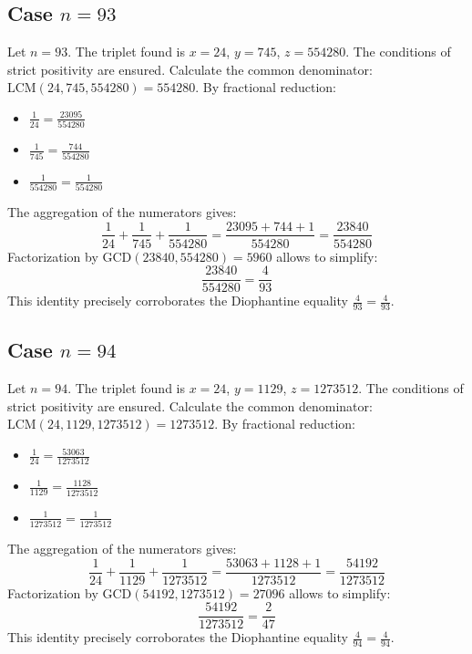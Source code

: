 \documentclass[11pt,a4paper]{article}
\begin{document}
\subsection{Case $n = 93$}
Let $n = 93$. The triplet found is $x = 24$, $y = 745$, $z = 554280$.
The conditions of strict positivity are ensured.
Calculate the common denominator: $\text{LCM}(24, 745, 554280) = 554280$.
By fractional reduction:
\begin{itemize}
    \item $\frac{1}{24} = \frac{23095}{554280}$
    \item $\frac{1}{745} = \frac{744}{554280}$
    \item $\frac{1}{554280} = \frac{1}{554280}$
\end{itemize}
The aggregation of the numerators gives:
$$ \frac{1}{24} + \frac{1}{745} + \frac{1}{554280} = \frac{23095 + 744 + 1}{554280} = \frac{23840}{554280} $$
Factorization by $\text{GCD}(23840, 554280) = 5960$ allows to simplify:
$$ \frac{23840}{554280} = \frac{4}{93} $$
This identity precisely corroborates the Diophantine equality $\frac{4}{93} = \frac{4}{93}$.

\subsection{Case $n = 94$}
Let $n = 94$. The triplet found is $x = 24$, $y = 1129$, $z = 1273512$.
The conditions of strict positivity are ensured.
Calculate the common denominator: $\text{LCM}(24, 1129, 1273512) = 1273512$.
By fractional reduction:
\begin{itemize}
    \item $\frac{1}{24} = \frac{53063}{1273512}$
    \item $\frac{1}{1129} = \frac{1128}{1273512}$
    \item $\frac{1}{1273512} = \frac{1}{1273512}$
\end{itemize}
The aggregation of the numerators gives:
$$ \frac{1}{24} + \frac{1}{1129} + \frac{1}{1273512} = \frac{53063 + 1128 + 1}{1273512} = \frac{54192}{1273512} $$
Factorization by $\text{GCD}(54192, 1273512) = 27096$ allows to simplify:
$$ \frac{54192}{1273512} = \frac{2}{47} $$
This identity precisely corroborates the Diophantine equality $\frac{4}{94} = \frac{4}{94}$.
\end{document}
